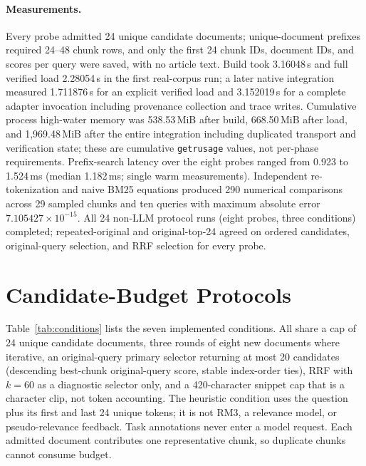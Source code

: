 \paragraph{Measurements.}
Every probe admitted 24 unique candidate documents; unique-document prefixes required 24--48 chunk rows, and only the first 24 chunk IDs, document IDs, and scores per query were saved, with no article text. Build took 3.16048\,s and full verified load 2.28054\,s in the first real-corpus run; a later native integration measured 1.711876\,s for an explicit verified load and 3.152019\,s for a complete adapter invocation including provenance collection and trace writes. Cumulative process high-water memory was 538.53\,MiB after build, 668.50\,MiB after load, and 1,969.48\,MiB after the entire integration including duplicated transport and verification state; these are cumulative \texttt{getrusage} values, not per-phase requirements. Prefix-search latency over the eight probes ranged from 0.923 to 1.524\,ms (median 1.182\,ms; single warm measurements). Independent re-tokenization and naive BM25 equations produced 290 numerical comparisons across 29 sampled chunks and ten queries with maximum absolute error $7.105427\times10^{-15}$. All 24 non-LLM protocol runs (eight probes, three conditions) completed; repeated-original and original-top-24 agreed on ordered candidates, original-query selection, and RRF selection for every probe.

\section{Candidate-Budget Protocols}
\label{app:budget}
Table~\ref{tab:conditions} lists the seven implemented conditions. All share a cap of 24 unique candidate documents, three rounds of eight new documents where iterative, an original-query primary selector returning at most 20 candidates (descending best-chunk original-query score, stable index-order ties), RRF with $k=60$ as a diagnostic selector only, and a 420-character snippet cap that is a character clip, not token accounting. The heuristic condition uses the question plus its first and last 24 unique tokens; it is not RM3, a relevance model, or pseudo-relevance feedback. Task annotations never enter a model request. Each admitted document contributes one representative chunk, so duplicate chunks cannot consume budget.

